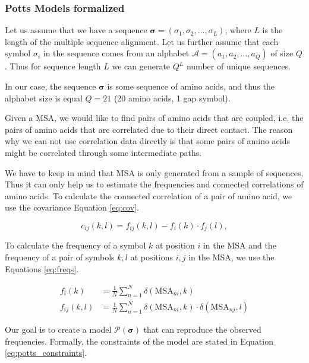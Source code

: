 \subsubsection{Potts Models formalized}
Let us assume that we have a sequence $\boldsymbol{\sigma} = (\sigma_1, \sigma_2, ..., \sigma_L)$, where $L$ is the length of the multiple sequence alignment. 
Let us further assume that each symbol $\sigma_i$ in the sequence comes from an alphabet $\mathcal{A} = (a_1, a_2, ..., a_Q)$ of size $Q$. 
Thus for sequence length $L$ we can generate $Q^L$ number of unique sequences.
    
In our case, the sequence $\boldsymbol{\sigma}$ is some sequence of amino acids, and thus the alphabet size is equal $Q = 21$ (20 amino acids, 1 gap symbol).
        
Given a MSA, we would like to find pairs of amino acids that are coupled, i.e. the pairs of amino acids that are correlated due to their direct contact. 
The reason why we can not use correlation data directly is that some pairs of amino acids might be correlated through some intermediate paths.
        
We have to keep in mind that MSA is only generated from a sample of sequences.
Thus it can only help us to estimate the frequencies and connected correlations of amino acids. 
To calculate the connected correlation of a pair of amino acid, we use the covariance Equation \ref{eq:cov}.

\begin{equation}
    c_{ij}(k, l) = f_{ij}(k, l) - f_{i}(k) \cdot f_{j}(l),
    \label{eq:cov}
\end{equation}

To calculate the frequency of a symbol $k$ at position $i$ in the MSA and the frequency of a pair of symbols $k, l$ at positions $i, j$ in the MSA, we use the Equations \ref{eq:freqs}.

\begin{equation}
    \begin{split}
        f_{i}(k)     &= \frac{1}{N} \sum_{n = 1}^N \delta(\text{MSA}_{ni}, k) \\    
        f_{ij}(k, l) &= \frac{1}{N} \sum_{n = 1}^N \delta(\text{MSA}_{ni}, k) \cdot \delta(\text{MSA}_{nj}, l)
        \label{eq:freqs}
    \end{split}
\end{equation}

Our goal is to create a model $\mathcal{P(\bm{\sigma})}$ that can reproduce the observed frequencies. 
Formally, the constraints of the model are stated in Equation \ref{eq:potts_constraints}.
        
